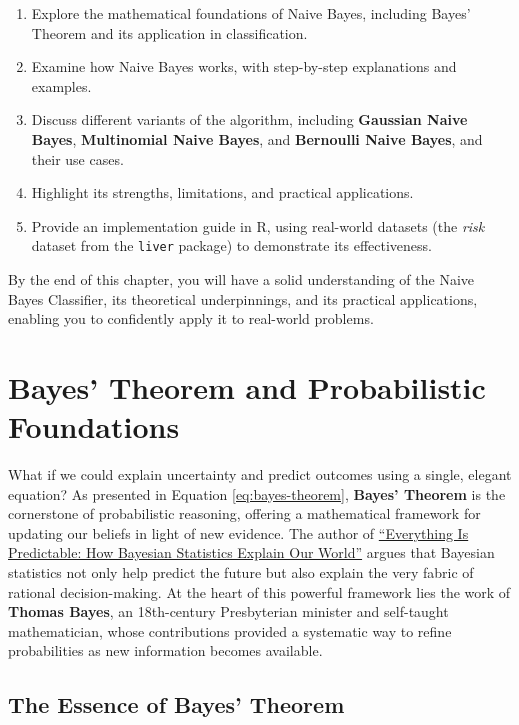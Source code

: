 \documentclass[
]{book}
\newcommand{\passthrough}[1]{#1}
\providecommand{\tightlist}{%
  \setlength{\itemsep}{0pt}\setlength{\parskip}{0pt}}
\theoremstyle{definition}
\theoremstyle{definition}
\theoremstyle{definition}
\theoremstyle{definition}
\theoremstyle{remark}
\begin{document}
\begin{enumerate}
\def\labelenumi{\arabic{enumi}.}
\tightlist
\item
  Explore the mathematical foundations of Naive Bayes, including Bayes' Theorem and its application in classification.
\item
  Examine how Naive Bayes works, with step-by-step explanations and examples.
\item
  Discuss different variants of the algorithm, including \textbf{Gaussian Naive Bayes}, \textbf{Multinomial Naive Bayes}, and \textbf{Bernoulli Naive Bayes}, and their use cases.
\item
  Highlight its strengths, limitations, and practical applications.
\item
  Provide an implementation guide in R, using real-world datasets (the \emph{risk} dataset from the \passthrough{\lstinline!liver!} package) to demonstrate its effectiveness.
\end{enumerate}

By the end of this chapter, you will have a solid understanding of the Naive Bayes Classifier, its theoretical underpinnings, and its practical applications, enabling you to confidently apply it to real-world problems.

\section{Bayes' Theorem and Probabilistic Foundations}\label{bayes-theorem-and-probabilistic-foundations}

What if we could explain uncertainty and predict outcomes using a single, elegant equation? As presented in Equation \eqref{eq:bayes-theorem}, \textbf{Bayes' Theorem} is the cornerstone of probabilistic reasoning, offering a mathematical framework for updating our beliefs in light of new evidence. The author of \href{https://www.goodreads.com/book/show/199798096-everything-is-predictable}{``Everything Is Predictable: How Bayesian Statistics Explain Our World''} argues that Bayesian statistics not only help predict the future but also explain the very fabric of rational decision-making. At the heart of this powerful framework lies the work of \textbf{Thomas Bayes}, an 18th-century Presbyterian minister and self-taught mathematician, whose contributions provided a systematic way to refine probabilities as new information becomes available.

\subsection*{The Essence of Bayes' Theorem}\label{the-essence-of-bayes-theorem}
\end{document}
